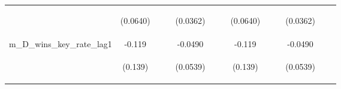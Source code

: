 \documentclass[]{article}
\begin{document}
\begin{center}
\begin{tabular}{lcccccccccccc}
\vspace{4pt} & \begin{footnotesize}(0.0640)\end{footnotesize} & \begin{footnotesize}\end{footnotesize} & \begin{footnotesize}\end{footnotesize} & \begin{footnotesize}(0.0362)\end{footnotesize} & \begin{footnotesize}\end{footnotesize} & \begin{footnotesize}\end{footnotesize} & \begin{footnotesize}(0.0640)\end{footnotesize} & \begin{footnotesize}\end{footnotesize} & \begin{footnotesize}\end{footnotesize} & \begin{footnotesize}(0.0362)\end{footnotesize} & \begin{footnotesize}\end{footnotesize} & \begin{footnotesize}\end{footnotesize} \\
m\_D\_wins\_key\_rate\_lag1 & -0.119 &  &  & -0.0490 &  &  & -0.119 &  &  & -0.0490 &  &  \\
\vspace{4pt} & \begin{footnotesize}(0.139)\end{footnotesize} & \begin{footnotesize}\end{footnotesize} & \begin{footnotesize}\end{footnotesize} & \begin{footnotesize}(0.0539)\end{footnotesize} & \begin{footnotesize}\end{footnotesize} & \begin{footnotesize}\end{footnotesize} & \begin{footnotesize}(0.139)\end{footnotesize} & \begin{footnotesize}\end{footnotesize} & \begin{footnotesize}\end{footnotesize} & \begin{footnotesize}(0.0539)\end{footnotesize} & \begin{footnotesize}\end{footnotesize} & \begin{footnotesize}\end{footnotesize} \\

\end{tabular}
\end{center}
\end{document}
